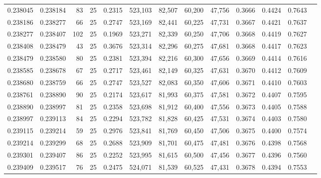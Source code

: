 \begin{tabular}{rrrrrrrrrrrrr}
0.238045 & 0.238184 &    83 &  25 &                                     0.2315 & 523,103 &  82,507 &  60,200 &  47,756 & 0.3666 & 0.4424 & 0.7643 \\
0.238186 & 0.238277 &    66 &  25 &                                     0.2747 & 523,169 &  82,441 &  60,225 &  47,731 & 0.3667 & 0.4421 & 0.7637 \\
0.238277 & 0.238407 &   102 &  25 &                                     0.1969 & 523,271 &  82,339 &  60,250 &  47,706 & 0.3668 & 0.4419 & 0.7627 \\
0.238408 & 0.238479 &    43 &  25 &                                     0.3676 & 523,314 &  82,296 &  60,275 &  47,681 & 0.3668 & 0.4417 & 0.7623 \\
0.238479 & 0.238580 &    80 &  25 &                                     0.2381 & 523,394 &  82,216 &  60,300 &  47,656 & 0.3669 & 0.4414 & 0.7616 \\
0.238585 & 0.238678 &    67 &  25 &                                     0.2717 & 523,461 &  82,149 &  60,325 &  47,631 & 0.3670 & 0.4412 & 0.7609 \\
0.238680 & 0.238759 &    66 &  25 &                                     0.2747 & 523,527 &  82,083 &  60,350 &  47,606 & 0.3671 & 0.4410 & 0.7603 \\
0.238761 & 0.238890 &    90 &  25 &                                     0.2174 & 523,617 &  81,993 &  60,375 &  47,581 & 0.3672 & 0.4407 & 0.7595 \\
0.238890 & 0.238997 &    81 &  25 &                                     0.2358 & 523,698 &  81,912 &  60,400 &  47,556 & 0.3673 & 0.4405 & 0.7588 \\
0.238997 & 0.239113 &    84 &  25 &                                     0.2294 & 523,782 &  81,828 &  60,425 &  47,531 & 0.3674 & 0.4403 & 0.7580 \\
0.239115 & 0.239214 &    59 &  25 &                                     0.2976 & 523,841 &  81,769 &  60,450 &  47,506 & 0.3675 & 0.4400 & 0.7574 \\
0.239214 & 0.239299 &    68 &  25 &                                     0.2688 & 523,909 &  81,701 &  60,475 &  47,481 & 0.3676 & 0.4398 & 0.7568 \\
0.239301 & 0.239407 &    86 &  25 &                                     0.2252 & 523,995 &  81,615 &  60,500 &  47,456 & 0.3677 & 0.4396 & 0.7560 \\
0.239409 & 0.239517 &    76 &  25 &                                     0.2475 & 524,071 &  81,539 &  60,525 &  47,431 & 0.3678 & 0.4394 & 0.7553 \\

\end{tabular}
